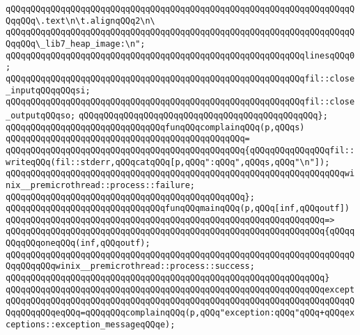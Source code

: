\verb|qQQqqQQqqQQqqQQqqQQqqQQqqQQqqQQqqQQqqQQqqQQqqQQqqQQqqQQqqQQqqQQqqQQqqQQqqQQq\.text\n\t.alignqQQq2\n\|\newline
\verb|qQQqqQQqqQQqqQQqqQQqqQQqqQQqqQQqqQQqqQQqqQQqqQQqqQQqqQQqqQQqqQQqqQQqqQQqqQQq\_lib7_heap_image:\n";|\newline
\newline
\verb|qQQqqQQqqQQqqQQqqQQqqQQqqQQqqQQqqQQqqQQqqQQqqQQqqQQqqQQqqQQqlinesqQQq0;|\newline
\newline
\verb|qQQqqQQqqQQqqQQqqQQqqQQqqQQqqQQqqQQqqQQqqQQqqQQqqQQqqQQqqQQqfil::close_inputqQQqqQQqsi;|\newline
\verb|qQQqqQQqqQQqqQQqqQQqqQQqqQQqqQQqqQQqqQQqqQQqqQQqqQQqqQQqqQQqfil::close_outputqQQqso;|\newline
\verb|qQQqqQQqqQQqqQQqqQQqqQQqqQQqqQQqqQQqqQQqqQQqqQQq};|\newline
\newline
\verb|qQQqqQQqqQQqqQQqqQQqqQQqqQQqqQQqfunqQQqcomplainqQQq(p,qQQqs)|\newline
\verb|qQQqqQQqqQQqqQQqqQQqqQQqqQQqqQQqqQQqqQQqqQQqqQQq=|\newline
\verb|qQQqqQQqqQQqqQQqqQQqqQQqqQQqqQQqqQQqqQQqqQQqqQQq{qQQqqQQqqQQqqQQqfil::writeqQQq(fil::stderr,qQQqcatqQQq[p,qQQq":qQQq",qQQqs,qQQq"\n"]);|\newline
\verb|qQQqqQQqqQQqqQQqqQQqqQQqqQQqqQQqqQQqqQQqqQQqqQQqqQQqqQQqqQQqqQQqqQQqwinix__premicrothread::process::failure;|\newline
\verb|qQQqqQQqqQQqqQQqqQQqqQQqqQQqqQQqqQQqqQQqqQQqqQQq};|\newline
\newline
\verb|qQQqqQQqqQQqqQQqqQQqqQQqqQQqqQQqfunqQQqmainqQQq(p,qQQq[inf,qQQqoutf])|\newline
\verb|qQQqqQQqqQQqqQQqqQQqqQQqqQQqqQQqqQQqqQQqqQQqqQQqqQQqqQQqqQQqqQQq=>|\newline
\verb|qQQqqQQqqQQqqQQqqQQqqQQqqQQqqQQqqQQqqQQqqQQqqQQqqQQqqQQqqQQqqQQq{qQQqqQQqqQQqoneqQQq(inf,qQQqoutf);|\newline
\verb|qQQqqQQqqQQqqQQqqQQqqQQqqQQqqQQqqQQqqQQqqQQqqQQqqQQqqQQqqQQqqQQqqQQqqQQqqQQqqQQqwinix__premicrothread::process::success;|\newline
\verb|qQQqqQQqqQQqqQQqqQQqqQQqqQQqqQQqqQQqqQQqqQQqqQQqqQQqqQQqqQQqqQQq}|\newline
\verb|qQQqqQQqqQQqqQQqqQQqqQQqqQQqqQQqqQQqqQQqqQQqqQQqqQQqqQQqqQQqqQQqexcept|\newline
\verb|qQQqqQQqqQQqqQQqqQQqqQQqqQQqqQQqqQQqqQQqqQQqqQQqqQQqqQQqqQQqqQQqqQQqqQQqqQQqqQQqeqQQq=qQQqqQQqcomplainqQQq(p,qQQq"exception:qQQq"qQQq+qQQqexceptions::exception_messageqQQqe);|\newline
